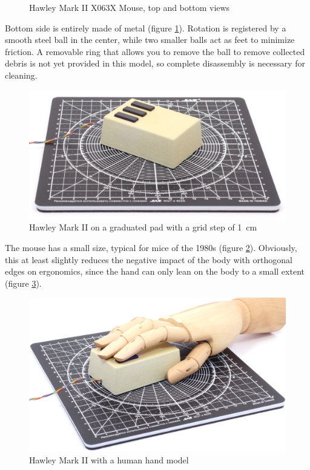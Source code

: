 \documentclass[11pt, a4paper]{article}
\begin{document}
\begin{figure}[h]
    \caption{Hawley Mark II X063X Mouse, top and bottom views}
    \label{fig:HawleyMarkIITopAndBottom}
\end{figure}



Bottom side is entirely made of metal (figure \ref{fig:HawleyMarkIITopAndBottom}). Rotation is registered by a smooth steel ball in the center, while two smaller balls act as feet to minimize friction. A removable ring that allows you to remove the ball to remove collected debris is not yet provided in this model, so complete disassembly is necessary for cleaning.

\begin{figure}[h]
    \centering
    \includegraphics[scale=0.5]{1982_hawley_mark_ii/size_30.jpg}
    \caption{Hawley Mark II on a graduated pad with a grid step of 1~cm}
    \label{fig:HawleyMarkIISize}
\end{figure}

The mouse has a small size, typical for mice of the 1980s (figure \ref{fig:HawleyMarkIISize}). Obviously, this at least slightly reduces the negative impact of the body with orthogonal edges on ergonomics, since the hand can only lean on the body to a small extent (figure \ref{fig:HawleyMarkIIHand}).

\begin{figure}[h]
    \centering
    \includegraphics[scale=0.5]{1982_hawley_mark_ii/hand_60.jpg}
    \caption{Hawley Mark II with a human hand model}
    \label{fig:HawleyMarkIIHand}
\end{figure}
\end{document}
